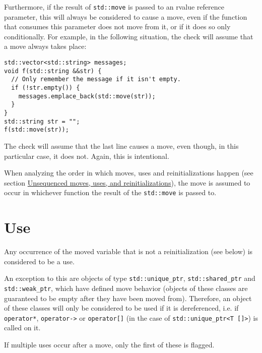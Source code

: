 Furthermore, if the result of \texttt{std::move} is passed to an rvalue reference parameter, this will always be considered to cause a move, even if the function that consumes this parameter does not move from it, or if it does so only conditionally. For example, in the following situation, the check will assume that a move always takes place:
\begin{verbatim}
std::vector<std::string> messages;
void f(std::string &&str) {
  // Only remember the message if it isn't empty.
  if (!str.empty()) {
    messages.emplace_back(std::move(str));
  }
}
std::string str = "";
f(std::move(str));
\end{verbatim}
The check will assume that the last line causes a move, even though, in this particular case, it does not. Again, this is intentional.

When analyzing the order in which moves, uses and reinitializations happen (see section \hyperref[sec:unsequenced-moves-uses-and-reinitializations]{Unsequenced moves, uses, and reinitializations}), the move is assumed to occur in whichever function the result of the \texttt{std::move} is passed to.

\section{Use}
Any occurrence of the moved variable that is not a reinitialization (see below) is considered to be a use.

An exception to this are objects of type \texttt{std::unique_ptr}, \texttt{std::shared_ptr} and \texttt{std::weak_ptr}, which have defined move behavior (objects of these classes are guaranteed to be empty after they have been moved from). Therefore, an object of these classes will only be considered to be used if it is dereferenced, i.e. if \texttt{operator*}, \texttt{operator->} or \texttt{operator[]} (in the case of \texttt{std::unique_ptr<T []>}) is called on it.

If multiple uses occur after a move, only the first of these is flagged.

